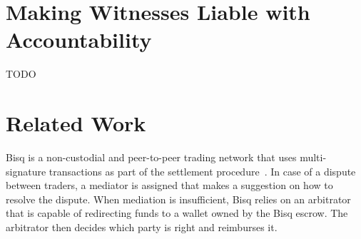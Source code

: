 \documentclass{article}
\begin{document}
\section{Making Witnesses Liable with Accountability}
TODO

\section{Related Work}
Bisq is a non-custodial and peer-to-peer trading network that uses multi-signature transactions as part of the settlement procedure~\cite{bisq}.
In case of a dispute between traders, a mediator is assigned that makes a suggestion on how to resolve the dispute.
When mediation is insufficient, Bisq relies on an arbitrator that is capable of redirecting funds to a wallet owned by the Bisq escrow.
The arbitrator then decides which party is right and reimburses it.



\end{document}
